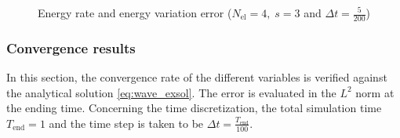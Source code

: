 \documentclass{elsarticle}
\begin{document}
\begin{figure}[p]%
\centering
{}%
%
\caption{Energy rate and energy variation error ($N_{\text{el}}=4,\; s=3$ and $\Delta t = \frac{5}{200}$)}%
\label{fig:energy_wave}%
\end{figure}

\subsubsection{Convergence results}
In this section, the convergence rate of the different variables is verified against the analytical solution \eqref{eq:wave_exsol}.  The error is evaluated in the $L^2$ norm at the ending time. Concerning the time discretization, the total simulation time $T_{\text{end}}=1$ and the time step is taken to be $\Delta t= \frac{T_{\text{end}}}{100}$. \\
\end{document}
